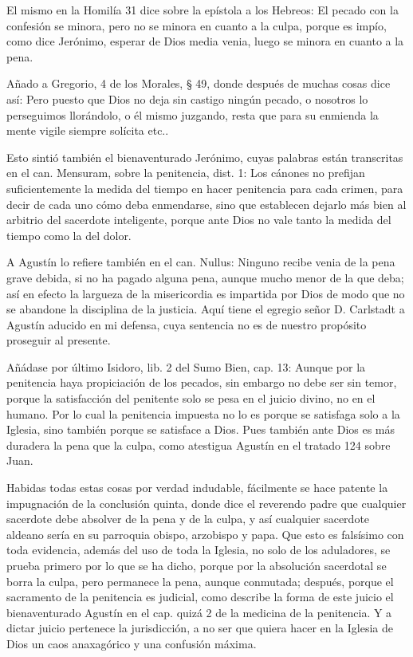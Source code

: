 El mismo en la Homilía 31 dice sobre la epístola a los Hebreos: El pecado con la confesión se minora, pero no se minora en cuanto a la culpa, porque es impío, como dice Jerónimo, esperar de Dios media venia, luego se minora en cuanto a la pena.

\marginpar{\small[375]} Añado a Gregorio, 4 de los Morales, § 49, donde después de muchas cosas dice así: Pero puesto que Dios no deja sin castigo ningún pecado, o nosotros lo perseguimos llorándolo, o él mismo juzgando, resta que para su enmienda la mente vigile siempre solícita etc..

Esto sintió también el bienaventurado Jerónimo, cuyas palabras están transcritas en el can. Mensuram, sobre la penitencia, dist. 1: Los cánones no prefijan suficientemente la medida del tiempo en hacer penitencia para cada crimen, para decir de cada uno cómo deba enmendarse, sino que establecen dejarlo más bien al arbitrio del sacerdote inteligente, porque ante Dios no vale tanto la medida del tiempo como la del dolor.

A Agustín lo refiere también en el can. Nullus: Ninguno recibe venia de la pena grave debida, si no ha pagado alguna pena, aunque mucho menor de la que deba; así en efecto la largueza de la misericordia es impartida por Dios de modo que no se abandone la disciplina de la justicia. Aquí tiene el egregio señor D. Carlstadt a Agustín aducido en mi defensa, cuya sentencia no es de nuestro propósito proseguir al presente.

Añádase por último Isidoro, lib. 2 del Sumo Bien, cap. 13: Aunque por la penitencia haya propiciación de los pecados, sin embargo no debe ser sin temor, porque la satisfacción del penitente solo se pesa en el juicio divino, no en el humano. Por lo cual la penitencia impuesta no lo es porque se satisfaga solo a la Iglesia, sino también porque se satisface a Dios. Pues también ante Dios es más duradera la pena que la culpa, como atestigua Agustín en el tratado 124 sobre Juan.

Habidas todas estas cosas por verdad indudable, fácilmente se hace patente la impugnación de la conclusión quinta, donde dice el reverendo padre que cualquier sacerdote debe absolver de la pena y de la culpa, y así cualquier sacerdote aldeano sería en su parroquia obispo, arzobispo y papa. Que esto es falsísimo con toda evidencia, además del uso de toda la Iglesia, no solo de los aduladores, se prueba primero por lo que se ha dicho, porque por la absolución sacerdotal se borra la culpa, pero permanece la pena, aunque conmutada; después, porque el sacramento de la penitencia es judicial, como describe la forma de este juicio el bienaventurado Agustín en el cap. quizá 2 de la medicina de la penitencia. Y a dictar juicio pertenece la jurisdicción, a no ser que quiera hacer en la Iglesia de Dios un caos anaxagórico y una confusión máxima.

